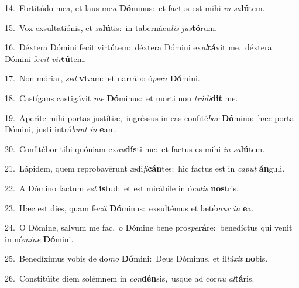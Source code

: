 {\numbfont\textcolor{\numbcolor}{14.}}~Fortitúdo mea, et laus me\textit{a} \textbf{Dó}\-minus:~\star et factus est mihi \textit{in} \textit{sa}\-\textbf{lú}tem.\par
{\numbfont\textcolor{\numbcolor}{15.}}~Vox exsultatiónis, et \textit{sa}\-\textbf{lú}tis:~\star in tabernácu\textit{lis} \textit{jus}\-\textbf{tó}rum.\par
{\numbfont\textcolor{\numbcolor}{16.}}~Déxtera Dómini fecit virtútem:~\dagger déxtera Dómini ex\-\textit{al}\-\textbf{tá}vit me,~\star déxtera Dómini fe\textit{cit} \textit{vir}\-\textbf{tú}tem.\par
{\numbfont\textcolor{\numbcolor}{17.}}~Non móriar, \textit{sed} \textbf{vi}\-vam:~\star et narrábo ó\-\textit{pe}\-\textit{ra} \textbf{Dó}\-mini.\par
{\numbfont\textcolor{\numbcolor}{18.}}~Castígans castigávit \textit{me} \textbf{Dó}\-minus:~\star et morti non \textit{trá}\-\textit{di}\textbf{dit} me.\par
{\numbfont\textcolor{\numbcolor}{19.}}~Aperíte mihi portas justítiæ,~\dagger ingréssus in eas confité\textit{bor} \textbf{Dó}\-mino:~\star hæc porta Dómini, justi intrá\textit{bunt} \textit{in} \textbf{e}\-am.\par
{\numbfont\textcolor{\numbcolor}{20.}}~Confitébor tibi quóniam ex\-\textit{au}\-\textbf{dís}ti me:~\star et factus es mihi \textit{in} \textit{sa}\-\textbf{lú}tem.\par
{\numbfont\textcolor{\numbcolor}{21.}}~Lápidem, quem reprobavérunt ædi\-\textit{fi}\-\textbf{cán}tes:~\star hic factus est in \textit{ca}\-\textit{put} \textbf{án}\-guli.\par
{\numbfont\textcolor{\numbcolor}{22.}}~A Dómino factum \textit{est} \textbf{is}\-tud:~\star et est mirábile in ó\-\textit{cu}\-\textit{lis} \textbf{nos}\-tris.\par
{\numbfont\textcolor{\numbcolor}{23.}}~Hæc est dies, quam fe\textit{cit} \textbf{Dó}\-minus:~\star exsultémus et læté\textit{mur} \textit{in} \textbf{e}\-a.\par
{\numbfont\textcolor{\numbcolor}{24.}}~O Dómine, salvum me fac,~\dagger o Dómine bene pro\-\textit{spe}\-\textbf{rá}re:~\star benedíctus qui venit in nó\-\textit{mi}\-\textit{ne} \textbf{Dó}\-mini.\par
{\numbfont\textcolor{\numbcolor}{25.}}~Benedíximus vobis de do\textit{mo} \textbf{Dó}\-mini:~\star Deus Dóminus, et il\-\textit{lú}\-\textit{xit} \textbf{no}\-bis.\par
{\numbfont\textcolor{\numbcolor}{26.}}~Constitúite diem solémnem in \textit{con}\-\textbf{dén}sis,~\star usque ad cor\textit{nu} \textit{al}\-\textbf{tá}ris.\par

